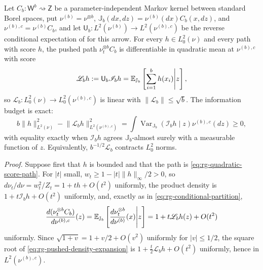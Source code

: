 Let \(C_b:\mathsf W^b\rightsquigarrow\mathsf Z\) be a parameter-independent Markov
kernel between standard Borel spaces, put \(\nu^{(b)}=\nu^{\otimes b}\),
\(\mathbb J_b(dx,dz)=\nu^{(b)}(dx)C_b(x,dz)\), and \(\nu^{(b),c}=\nu^{(b)}C_b\), and
let \(\mathsf U_b:L^2(\nu^{(b)})\to L^2(\nu^{(b),c})\) be the reverse conditional expectation of
 for this arrow. For every \(h\in L^2_0(\nu)\) and
every path with score \(h\), the pushed path \(\nu_t^{\otimes b}C_b\) is differentiable
in quadratic mean at \(\nu^{(b),c}\) with score
\begin{equation}
\mathscr L_bh:=\mathsf U_b\mathscr I_bh
=\mathbb E_{\mathbb J_b}\left[\sum_{i=1}^bh(x_i)\middle| z\right],
\label{eq:rg-score-renormalization-operator}
\end{equation}
so \(\mathscr L_b:L^2_0(\nu)\to L^2_0(\nu^{(b),c})\) is linear with
\(\lVert\mathscr L_b\rVert\leq\sqrt b\). The information budget is exact:
\begin{equation}
b\lVert h\rVert_{L^2(\nu)}^2
-\lVert\mathscr L_bh\rVert_{L^2(\nu^{(b),c})}^2
=\int\operatorname{Var}_{\mathbb J_b}\left(\mathscr I_bh\middle| z\right)
\nu^{(b),c}(dz)
\geq0,
\label{eq:rg-extensive-fisher-defect}
\end{equation}
with equality exactly when \(\mathscr I_bh\) agrees \(\mathbb J_b\)-almost surely with a
measurable function of \(z\). Equivalently, \(b^{-1/2}\mathscr L_b\) contracts
\(L^2_0\) norms. 

\noindent\emph{Proof.}
Suppose first that \(h\) is bounded and that the path is
\eqref{eq:rg-quadratic-score-path}. For \(\lvert t\rvert\) small, \(w_t\geq1-\lvert t\rvert\lVert h\rVert_\infty/2>0\),
so \(d\nu_t/d\nu=w_t^2/Z_t=1+th+O(t^2)\) uniformly, the product density is
\(1+t\mathscr I_bh+O(t^2)\) uniformly, and, exactly as in
\eqref{eq:rg-conditional-partition},
\begin{equation}
\frac{d(\nu_t^{\otimes b}C_b)}{d\nu^{(b),c}}(z)
=\mathbb E_{\mathbb J_b}\left[
\frac{d\nu_t^{\otimes b}}{d\nu^{(b)}}(x)\middle| z\right]
=1+t\mathscr L_bh(z)+O(t^2)
\label{eq:rg-pushed-density-expansion}
\end{equation}
uniformly. Since \(\sqrt{1+v}=1+v/2+O(v^2)\) uniformly for \(\lvert v\rvert\leq1/2\), the
square root of \eqref{eq:rg-pushed-density-expansion} is
\(1+\tfrac t2\mathscr L_bh+O(t^2)\) uniformly, hence in \(L^2(\nu^{(b),c})\).

